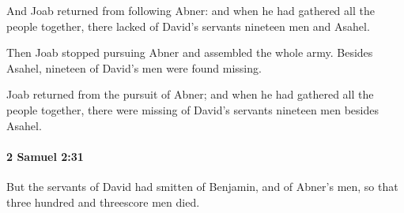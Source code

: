 			\begin{versebox}
					\item[BHS] 
					\item[ASV] And Joab returned from following Abner: and when he had gathered all the people together, there lacked of David's servants nineteen men and Asahel.
					\item[NIV] Then Joab stopped pursuing Abner and assembled the whole army. Besides Asahel, nineteen of David’s men were found missing.
					\item[NRSV] Joab returned from the pursuit of Abner; and when he had gathered all the people together, there were missing of David’s servants nineteen men besides Asahel.
			\end{versebox}

		\paragraph{2 Samuel 2:31} %
			\label{2SAMUEL-2-31}

			But the servants of David had smitten of Benjamin, and of Abner’s men, so that three hundred and threescore men died.

